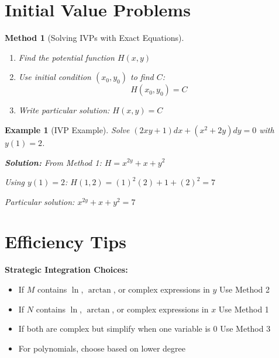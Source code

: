 \documentclass[12pt]{article}
\newtheorem{method}{Method}
\newtheorem{example}{Example}
\begin{document}
\section{Initial Value Problems}

\begin{method}[Solving IVPs with Exact Equations]
\begin{enumerate}
    \item Find the potential function $H(x,y)$
    \item Use initial condition $(x_{0}, y_{0})$ to find $C$:
    \[H(x_{0}, y_{0}) = C\]
    \item Write particular solution: $H(x,y) = C$
\end{enumerate}
\end{method}

\begin{example}[IVP Example]
Solve $(2xy + 1)dx + (x^{2} + 2y)dy = 0$ with $y(1) = 2$.

\textbf{Solution:} From Method 1: $H = x^{2y} + x + y^{2}$

Using $y(1) = 2$: $H(1,2) = (1)^{2}(2) + 1 + (2)^{2} = 7$

Particular solution: $x^{2y} + x + y^{2} = 7$
\end{example}

\section{Efficiency Tips}

\begin{insight}
\textbf{Strategic Integration Choices:}
\begin{itemize}
    \item If $M$ contains $\ln$, $\arctan$, or complex expressions in $y$ \rightarrow Use Method 2
    \item If $N$ contains $\ln$, $\arctan$, or complex expressions in $x$ \rightarrow Use Method 1
    \item If both are complex but simplify when one variable is 0 \rightarrow Use Method 3
    \item For polynomials, choose based on lower degree
\end{itemize}
\end{insight}
\end{document}
